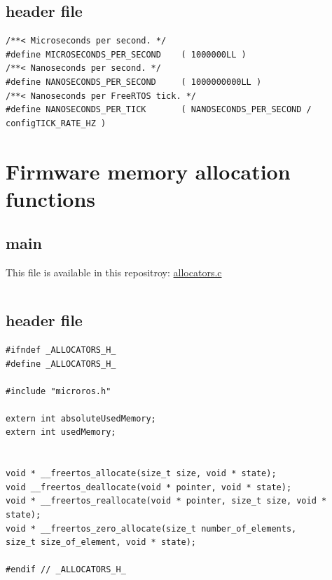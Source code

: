 \documentclass[10pt]{article}
\begin{document}
\subsection{header file}
\label{sec:org93db2cc}
\begin{verbatim}
/**< Microseconds per second. */
#define MICROSECONDS_PER_SECOND    ( 1000000LL )  
/**< Nanoseconds per second. */
#define NANOSECONDS_PER_SECOND     ( 1000000000LL ) 
/**< Nanoseconds per FreeRTOS tick. */  
#define NANOSECONDS_PER_TICK       ( NANOSECONDS_PER_SECOND / configTICK_RATE_HZ ) 
\end{verbatim}


\pagebreak
\section{Firmware memory allocation functions}
\label{sec:org1e0e36c}

\subsection{main}
\label{sec:org2a65345}
This file is available in this repositroy: \href{https://gitlab.com/sunoc/xilinx-kria-kv260-documentation/-/blob/b7300116e153f4b5a1542f8804e4646db8030033/src/allocators.c}{allocators.c}
\inputminted[linenos, frame=single]{c}{./src/allocators.c}

\subsection{header file}
\label{sec:org6649dfd}
\begin{verbatim}
#ifndef _ALLOCATORS_H_
#define _ALLOCATORS_H_

#include "microros.h"

extern int absoluteUsedMemory;
extern int usedMemory;


void * __freertos_allocate(size_t size, void * state);
void __freertos_deallocate(void * pointer, void * state);
void * __freertos_reallocate(void * pointer, size_t size, void * state);
void * __freertos_zero_allocate(size_t number_of_elements,
size_t size_of_element, void * state);

#endif // _ALLOCATORS_H_
\end{verbatim}
\end{document}
